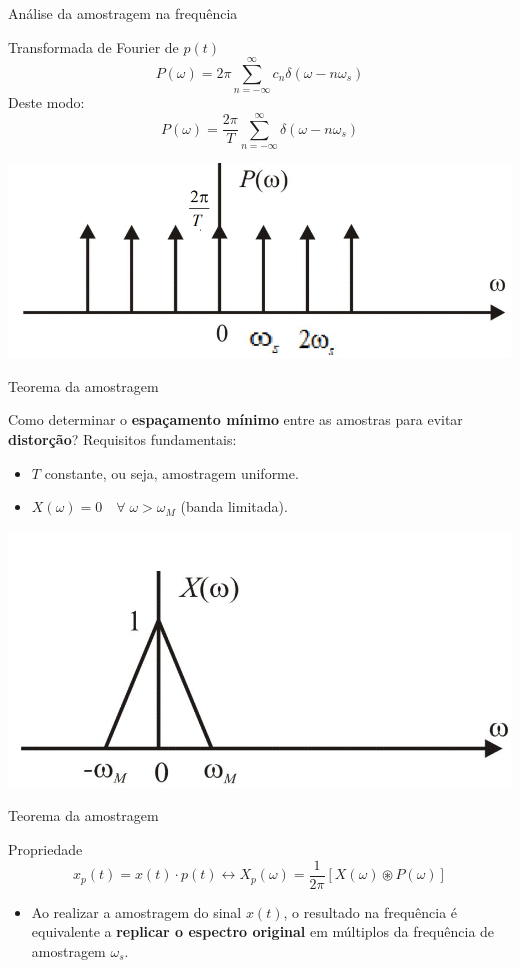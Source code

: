 \begin{frame}{Análise da amostragem na frequência}
\begin{block}{Transformada de Fourier de $p(t)$}
$$P(\omega) = 2\pi \sum_{n=-\infty}^{\infty}c_n \delta(\omega - n\omega_s)$$
Deste modo:
$$P(\omega) = \dfrac{2\pi}{T} \sum_{n=-\infty}^{\infty}\delta(\omega - n\omega_s)$$
\end{block}
\vspace{0.5cm}
\centerline{\includegraphics[width=0.6\linewidth]{Figuras/Ch02/fig8.PNG}}
\end{frame}

\begin{frame}{Teorema da amostragem}
\begin{block}{Como determinar o \textbf{espaçamento mínimo} entre as amostras para evitar \textbf{distorção}?}
Requisitos fundamentais:
\begin{itemize}
    \item $T$ constante, ou seja, amostragem uniforme.
    \item $X(\omega) = 0 \quad \forall \; \omega > \omega_M$ (banda limitada).
\end{itemize}
\end{block}
\centerline{\includegraphics[width=0.6\linewidth]{Figuras/Ch02/fig9.PNG}}
\end{frame}

\begin{frame}{Teorema da amostragem}
\begin{block}{Propriedade}
$$\boxed{x_p(t) = x(t) \cdot p(t) \leftrightarrow X_p(\omega) = \dfrac{1}{2\pi}\left[X(\omega) \circledast P(\omega)\right]}$$
\begin{itemize}
    \item Ao realizar a amostragem do sinal $x(t)$, o resultado na frequência é equivalente a \textbf{replicar o espectro original} em múltiplos da frequência de amostragem $\omega_s$.
\end{itemize}
\end{block}
\end{frame}

